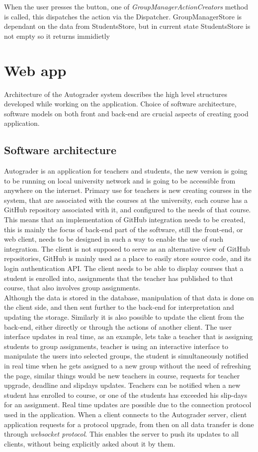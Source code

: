 When the user presses the button, one of \emph{GroupManagerActionCreators} method is called, this dispatches the action via the Dispatcher. GroupManagerStore is dependant on the data from StudentsStore, but in current state StudentsStore is not empty so it returns immidietly 

\section{Web app}
Architecture of the Autograder system describes the high level structures developed while working on the application. Choice of software architecture, software models on both front and back-end are crucial aspects of creating good application.
\subsection{Software architecture}
Autograder is an application for teachers and students, the new version is going to be running on local university network and is going to be accessible from anywhere on the internet. Primary use for teachers is new creating courses in the system, that are associated with the courses at the university, each course has a GitHub repository associated with it, and configured to the needs of that course. This means that an implementation of GitHub integration needs to be created, this is mainly the focus of back-end part of the software, still the front-end, or web client, needs to be designed in such a way to enable the
 use of such integration. The client is not supposed to serve as an alternative view of GitHub repositories, GitHub is mainly used as a place to easily store source code, and its login authentication API. The client needs to be able to display courses that a student is enrolled into, assignments that the teacher has published to that course, that also involves group assignments.
\\Although the data is stored in the database, manipulation of that data is done on the client side, and then sent further to the back-end for interpretation and updating the storage. Similarly it is also possible to update the client from the back-end, either directly or through the actions of another client. The user interface updates in real time, as an example, lets take a teacher that is assigning students to group assignments, teacher is using an interactive interface to manipulate the users into selected groups, the student is simultaneously notified in real time when he gets assigned to a new group without the need of refreshing the page, similar things would be new teachers in course, requests for teacher upgrade, deadline and slipdays updates. Teachers can be notified when a new student has enrolled to course, or one of the students has exceeded his slip-days for an assignment. Real time updates are possible due to the connection protocol used in the application. When a client connects to the Autograder server, client application requests for a protocol upgrade, from then on all data transfer is done through \emph{websocket protocol}\cite{websocket}. This enables the server to push its updates to all clients, without being explicitly asked about it by them.

